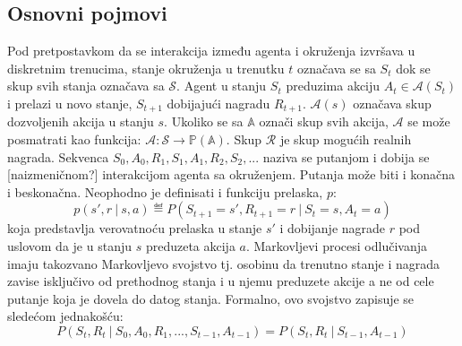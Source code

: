 \subsection{Osnovni pojmovi}
Pod pretpostavkom da se interakcija između agenta i okruženja izvršava u diskretnim trenucima, stanje okruženja u trenutku $t$ označava se sa $S_t$ dok se skup svih stanja označava sa $\mathcal{S}$.  Agent u stanju $S_t$ preduzima akciju $A_t \in \mathcal{A}(S_t)$ i prelazi u novo stanje, $S_{t+1}$ dobijajući nagradu $R_{t+1}$. $\mathcal{A}(s)$ označava skup dozvoljenih akcija u stanju $s$. Ukoliko se sa $\mathbb{A}$ označi skup svih akcija, $\mathcal{A}$ se može posmatrati kao funkcija:  $\mathcal{A}: \mathcal{S} \rightarrow  \mathbb{P}(\mathbb{A})$. Skup $\mathcal{R}$ je skup mogućih realnih nagrada. Sekvenca $S_0, A_0, R_1, S_1, A_1, R_2, S_2, ...$ naziva se putanjom i dobija se [naizmeničnom?] interakcijom agenta sa okruženjem. Putanja može biti i konačna i beskonačna.
Neophodno je definisati i funkciju prelaska, $p$:
\begin{equation}
	p(s', r~|~s, a) \eqdef P(S_{t+1} = s', R_{t+1} = r ~|~ S_t = s, A_t = a)
\end{equation}
koja predstavlja verovatnoću prelaska u stanje $s'$ i dobijanje nagrade $r$ pod uslovom da je u stanju $s$ preduzeta akcija $a$. Markovljevi procesi odlučivanja imaju takozvano Markovljevo svojstvo tj. osobinu da trenutno stanje i nagrada zavise isključivo od prethodnog stanja i u njemu preduzete akcije a ne od cele putanje koja je dovela do datog stanja. Formalno, ovo svojstvo zapisuje se sledećom jednakošću:
\begin{equation}
	P(S_t, R_t ~|~ S_0, A_0, R_1, ..., S_{t-1}, A_{t-1}) = P(S_t, R_t ~|~ S_{t-1}, A_{t-1})
\end{equation}

